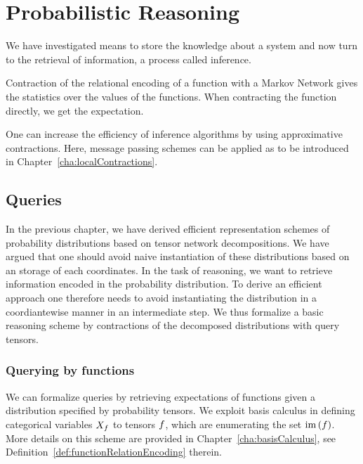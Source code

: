 \section{Probabilistic Reasoning}\label{cha:probReasoning} 

We have investigated means to store the knowledge about a system and now turn to the retrieval of information, a process called inference.

% 
Contraction of the relational encoding of a function with a Markov Network gives the statistics over the values of the functions.
When contracting the function directly, we get the expectation.

One can increase the efficiency of inference algorithms by using approximative contractions.
Here, message passing schemes can be applied as to be introduced in Chapter~\ref{cha:localContractions}.


\subsection{Queries}

In the previous chapter, we have derived efficient representation schemes of probability distributions based on tensor network decompositions.
We have argued that one should avoid naive instantiation of these distributions based on an storage of each coordinates.
In the task of reasoning, we want to retrieve information encoded in the probability distribution.
To derive an efficient approach one therefore needs to avoid instantiating the distribution in a coordiantewise manner in an intermediate step.
We thus formalize a basic reasoning scheme by contractions of the decomposed distributions with query tensors.

\subsubsection{Querying by functions}

We can formalize queries by retrieving expectations of functions given a distribution specified by probability tensors. 
We exploit basis calculus in defining categorical variables $X_{f}$ to tensors $f$, which are enumerating the set $\mathrm{im}\left(f\right)$.
More details on this scheme are provided in Chapter~\ref{cha:basisCalculus}, see Definition~\ref{def:functionRelationEncoding} therein.

